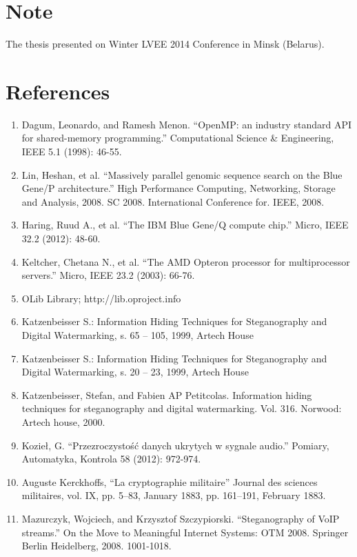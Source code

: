 \documentclass[10pt, a5paper]{article}
\begin{document}
\section*{Note}
The thesis presented on Winter LVEE 2014 Conference in Minsk (Belarus).
\section*{References}
\longpage
\begin{enumerate}
  \item Dagum, Leonardo, and Ramesh Menon. ``OpenMP: an industry standard API for shared-memory programming.'' Computational Science \& Engineering, IEEE 5.1 (1998): 46-55.
  \item Lin, Heshan, et al. ``Massively parallel genomic sequence search on the Blue Gene/P architecture.'' High Performance Computing, Networking, Storage and Analysis, 2008. SC 2008. International Conference for. IEEE, 2008.
  \item Haring, Ruud A., et al. ``The IBM Blue Gene/Q compute chip.'' Micro, IEEE 32.2 (2012): 48-60.
  \item Keltcher, Chetana N., et al. ``The AMD Opteron processor for multiprocessor servers.'' Micro, IEEE 23.2 (2003): 66-76.
  \item OLib Library; http://lib.oproject.info
  \item Katzenbeisser S.: Information Hiding Techniques for Steganogra\-phy and Digital Watermarking, s. 65 -- 105, 1999, Artech House
  \item Katzenbeisser S.: Information Hiding Techniques for Steganogra\-phy and Digital Watermarking, s. 20 -- 23, 1999, Artech House
  \item Katzenbeisser, Stefan, and Fabien AP Petitcolas. Information hiding techniques for steganography and digital watermarking. Vol. 316. Norwood: Artech house, 2000.
  \item Kozieł, G. ``Przezroczystość danych ukrytych w sygnale audio.'' Pomiary, Automatyka, Kontrola 58 (2012): 972-974.
  \item Auguste Kerckhoffs, ``La cryptographie militaire'' Journal des sci\-ences militaires, vol. IX, pp. 5–83, January 1883, pp. 161–191, February 1883.
  \item Mazurczyk, Wojciech, and Krzysztof Szczypiorski. ``Steganogra\-phy of VoIP streams.'' On the Move to Meaningful Internet Sys\-tems: OTM 2008. Springer Berlin Heidelberg, 2008. 1001-1018.
\end{enumerate}
\end{document}
